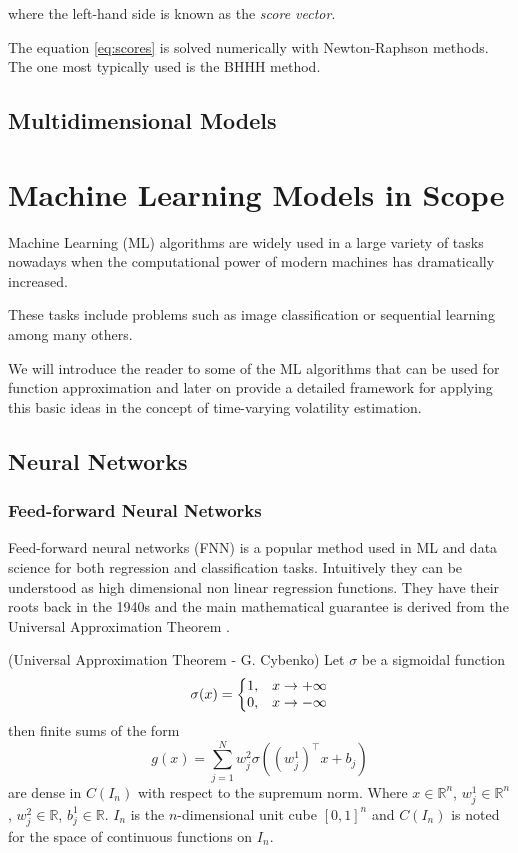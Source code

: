 \documentclass[a4paper, oneside]{discothesis}
\begin{document}
where the left-hand side is known as the \textit{score vector}.  

The equation \ref{eq:scores} is solved numerically with Newton-Raphson methods. The one most typically used is the BHHH \cite{bhhh} method.

\section{Multidimensional Models}

\chapter{Machine Learning Models in Scope}
Machine Learning (ML) algorithms are widely used in a large variety of tasks nowadays when the computational power of modern machines has dramatically increased. 

These tasks include problems such as image classification \cite{imageNet} or sequential learning  \cite{https://doi.org/10.48550/arxiv.1706.03762} among many others.

We will introduce the reader to some of the ML algorithms that can be used for function approximation and later on provide a detailed framework for applying this basic ideas in the concept of time-varying volatility estimation.  

\section{Neural Networks}
\subsection{Feed-forward Neural Networks}

Feed-forward neural networks (FNN) is a popular method used in ML and data science for both regression and classification tasks. Intuitively they can be understood as high dimensional non linear regression functions. They have their roots back in the 1940s and the main mathematical guarantee is derived from the Universal Approximation Theorem \cite{Cybenko1989ApproximationBS}. 

\theorem (Universal Approximation Theorem - G. Cybenko) Let $\sigma$ be a sigmoidal function 
\begin{equation}
\sigma(x) = \left\{ \begin{array}{@{}ll@{}}
    1, &  x\rightarrow+\infty  \\
    0, & x\rightarrow-\infty
\end{array}\right.
\end{equation}
then finite sums of the form 
\begin{equation}
g(x) = \sum_{j=1}^{N} w_j^2\sigma((w^1_j)^\intercal x+b_j)
\end{equation}
are dense in $C(I_n)$ with respect to the supremum norm. Where $x\in \mathbb{R}^n$, $w_j^1\in  \mathbb{R}^n$, $w_j^2\in \mathbb{R}$, $b_j^1\in \mathbb{R}$. $I_n$ is the $n$-dimensional unit cube $[0,1]^n$ and $C(I_n)$ is noted for the space of continuous functions on $I_n$.
\end{document}
